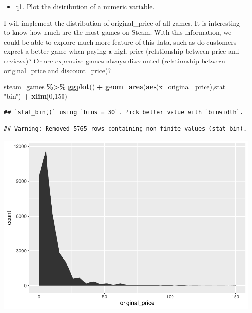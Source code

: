 \documentclass[
]{article}
\newenvironment{Shaded}{\begin{snugshade}}{\end{snugshade}}
\newcommand{\DataTypeTok}[1]{\textcolor[rgb]{0.13,0.29,0.53}{#1}}
\newcommand{\DecValTok}[1]{\textcolor[rgb]{0.00,0.00,0.81}{#1}}
\newcommand{\KeywordTok}[1]{\textcolor[rgb]{0.13,0.29,0.53}{\textbf{#1}}}
\newcommand{\NormalTok}[1]{#1}
\newcommand{\OperatorTok}[1]{\textcolor[rgb]{0.81,0.36,0.00}{\textbf{#1}}}
\newcommand{\StringTok}[1]{\textcolor[rgb]{0.31,0.60,0.02}{#1}}
\providecommand{\tightlist}{%
  \setlength{\itemsep}{0pt}\setlength{\parskip}{0pt}}
\begin{document}
\begin{itemize}
\tightlist
\item
  q1. Plot the distribution of a numeric variable.
\end{itemize}

I will implement the distribution of original\_price of all games. It is
interesting to know how much are the most games on Steam. With this
information, we could be able to explore much more feature of this data,
such as do customers expect a better game when paying a high price
(relationship between price and reviews)? Or are expensive games always
discounted (relationship between original\_price and discount\_price)?

\begin{Shaded}
\begin{Highlighting}[]
\NormalTok{ steam\_games }\OperatorTok{\%\textgreater{}\%}
\StringTok{  }\KeywordTok{ggplot}\NormalTok{() }\OperatorTok{+}
\StringTok{  }\KeywordTok{geom\_area}\NormalTok{(}\KeywordTok{aes}\NormalTok{(}\DataTypeTok{x=}\NormalTok{original\_price),}\DataTypeTok{stat =} \StringTok{"bin"}\NormalTok{) }\OperatorTok{+}
\StringTok{  }\KeywordTok{xlim}\NormalTok{(}\DecValTok{0}\NormalTok{,}\DecValTok{150}\NormalTok{)}
\end{Highlighting}
\end{Shaded}

\begin{verbatim}
## `stat_bin()` using `bins = 30`. Pick better value with `binwidth`.
\end{verbatim}

\begin{verbatim}
## Warning: Removed 5765 rows containing non-finite values (stat_bin).
\end{verbatim}

\includegraphics{mini-project-1_files/figure-latex/unnamed-chunk-11-1.pdf}
\end{document}
